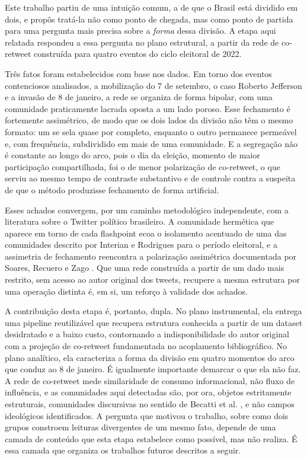 \documentclass[conference]{IEEEtran}
\begin{document}
Este trabalho partiu de uma intuição comum, a de que o Brasil está dividido em dois, e propôs tratá-la não como ponto de chegada, mas como ponto de partida para uma pergunta mais precisa sobre a \emph{forma} dessa divisão. A etapa aqui relatada respondeu a essa pergunta no plano estrutural, a partir da rede de co-retweet construída para quatro eventos do ciclo eleitoral de 2022.

Três fatos foram estabelecidos com base nos dados. Em torno dos eventos contenciosos analisados, a mobilização do 7 de setembro, o caso Roberto Jefferson e a invasão de 8 de janeiro, a rede se organiza de forma bipolar, com uma comunidade praticamente lacrada oposta a um lado poroso. Esse fechamento é fortemente assimétrico, de modo que os dois lados da divisão não têm o mesmo formato: um se sela quase por completo, enquanto o outro permanece permeável e, com frequência, subdividido em mais de uma comunidade. E a segregação não é constante ao longo do arco, pois o dia da eleição, momento de maior participação compartilhada, foi o de menor polarização de co-retweet, o que serviu ao mesmo tempo de contraste substantivo e de controle contra a suspeita de que o método produzisse fechamento de forma artificial.

Esses achados convergem, por um caminho metodológico independente, com a literatura sobre o Twitter político brasileiro. A comunidade hermética que aparece em torno de cada flashpoint ecoa o isolamento acentuado de uma das comunidades descrito por Interian e Rodrigues \cite{b_interian2023} para o período eleitoral, e a assimetria de fechamento reencontra a polarização assimétrica documentada por Soares, Recuero e Zago \cite{b_soares2019}. Que uma rede construída a partir de um dado mais restrito, sem acesso ao autor original dos tweets, recupere a mesma estrutura por uma operação distinta é, em si, um reforço à validade dos achados.

A contribuição desta etapa é, portanto, dupla. No plano instrumental, ela entrega uma pipeline reutilizável que recupera estrutura conhecida a partir de um dataset desidratado e a baixo custo, contornando a indisponibilidade do autor original com a projeção de co-retweet fundamentada no acoplamento bibliográfico. No plano analítico, ela caracteriza a forma da divisão em quatro momentos do arco que conduz ao 8 de janeiro. É igualmente importante demarcar o que ela não faz. A rede de co-retweet mede similaridade de consumo informacional, não fluxo de influência, e as comunidades aqui detectadas são, por ora, objetos estritamente estruturais, comunidades discursivas no sentido de Becatti et al. \cite{b_becatti2019}, e não campos ideológicos identificados. A pergunta que motivou o trabalho, sobre como dois grupos constroem leituras divergentes de um mesmo fato, depende de uma camada de conteúdo que esta etapa estabelece como possível, mas não realiza. É essa camada que organiza os trabalhos futuros descritos a seguir.
\end{document}
